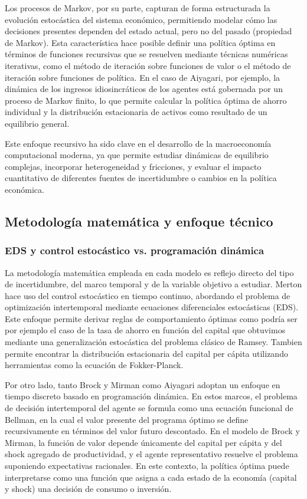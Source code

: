 \documentclass[a4paper,12pt]{article}
\begin{document}
Los procesos de Markov, por su parte, capturan de forma estructurada la evolución estocástica del sistema económico, permitiendo modelar cómo las decisiones presentes dependen del estado actual, pero no del pasado (propiedad de Markov). Esta característica hace posible definir una política óptima en términos de funciones recursivas que se resuelven mediante técnicas numéricas iterativas, como el método de iteración sobre funciones de valor o el método de iteración sobre funciones de política. En el caso de Aiyagari, por ejemplo, la dinámica de los ingresos idiosincráticos de los agentes está gobernada por un proceso de Markov finito, lo que permite calcular la política óptima de ahorro individual y la distribución estacionaria de activos como resultado de un equilibrio general.

Este enfoque recursivo ha sido clave en el desarrollo de la macroeconomía computacional moderna, ya que permite estudiar dinámicas de equilibrio complejas, incorporar heterogeneidad y fricciones, y evaluar el impacto cuantitativo de diferentes fuentes de incertidumbre o cambios en la política económica.

\subsection{Metodología matemática y enfoque técnico}

\subsubsection{EDS y control estocástico vs. programación dinámica}

La metodología matemática empleada en cada modelo es reflejo directo del tipo de incertidumbre, del marco temporal y de la variable objetivo a estudiar. Merton hace uso del control estocástico en tiempo continuo, abordando el problema de optimización intertemporal mediante ecuaciones diferenciales estocásticas (EDS). Este enfoque permite derivar reglas de comportamiento óptimas como podría ser por ejemplo el caso de la tasa de ahorro en función del capital que obtuvimos mediante una generalización estocástica del problema clásico de Ramsey. Tambien permite encontrar la distribución estacionaria del capital per cápita utilizando herramientas como la ecuación de Fokker-Planck.

Por otro lado, tanto Brock y Mirman como Aiyagari adoptan un enfoque en tiempo discreto basado en programación dinámica. En estos marcos, el problema de decisión intertemporal del agente se formula como una ecuación funcional de Bellman, en la cual el valor presente del programa óptimo se define recursivamente en términos del valor futuro descontado. 
En el modelo de Brock y Mirman, la función de valor depende únicamente del capital per cápita y del shock agregado de productividad, y el agente representativo resuelve el problema suponiendo expectativas racionales. En este contexto, la política óptima puede interpretarse como una función que asigna a cada estado de la economía (capital y shock) una decisión de consumo o inversión.
\end{document}
